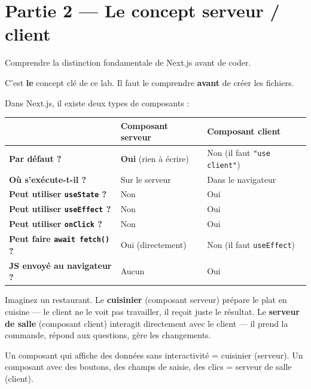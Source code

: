 \documentclass[11pt,a4paper]{article}
\begin{document}
\section{Partie 2 --- Le concept serveur / client}
\label{sec:server-client}

\begin{objectifbox}
Comprendre la distinction fondamentale de Next.js avant de coder.
\end{objectifbox}

C'est \textbf{le} concept clé de ce lab. Il faut le comprendre \textbf{avant} de créer les fichiers.

Dans Next.js, il existe deux types de composants :

\begin{center}
\begin{tabular}{lp{4.5cm}p{4.5cm}}
\toprule
& \textbf{Composant serveur} & \textbf{Composant client} \\
\midrule
\textbf{Par défaut ?} & \textbf{Oui} (rien à écrire) & Non (il faut \texttt{"use client"}) \\
\textbf{Où s'exécute-t-il ?} & Sur le serveur & Dans le navigateur \\
\textbf{Peut utiliser \texttt{useState} ?} & Non & Oui \\
\textbf{Peut utiliser \texttt{useEffect} ?} & Non & Oui \\
\textbf{Peut utiliser \texttt{onClick} ?} & Non & Oui \\
\textbf{Peut faire \texttt{await fetch()} ?} & Oui (directement) & Non (il faut \texttt{useEffect}) \\
\textbf{JS envoyé au navigateur ?} & Aucun & Oui \\
\bottomrule
\end{tabular}
\end{center}

\begin{infobox}
Imaginez un restaurant. Le \textbf{cuisinier} (composant serveur) prépare le plat en cuisine --- le client ne le voit pas travailler, il reçoit juste le résultat. Le \textbf{serveur de salle} (composant client) interagit directement avec le client --- il prend la commande, répond aux questions, gère les changements.

Un composant qui affiche des données sans interactivité = cuisinier (serveur). Un composant avec des boutons, des champs de saisie, des clics = serveur de salle (client).
\end{infobox}
\end{document}
